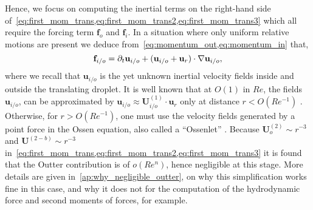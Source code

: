 Hence, we focus on computing the inertial terms on the right-hand side of~\ref{eq:first_mom_trans,eq:first_mom_trans2,eq:first_mom_trans3} which all require the forcing term $\textbf{f}_o$ and $\textbf{f}_i$. 
In a situation where only uniform relative motions are present we deduce from~\ref{eq:momentum_out,eq:momentum_in} that, 
\begin{equation}
    \textbf{f}_{i/o} = \partial_t \textbf{u}_{i/o} + (\textbf{u}_{i/o} + \textbf{u}_r)\cdot \mathbf{\nabla} \textbf{u}_{i/o},
\end{equation}
where we recall that $\textbf{u}_{i/o}$ is the yet unknown inertial velocity fields inside and outside the translating droplet. 
It is well known that at $O(1)$ in $Re$, the fields $\textbf{u}_{i/o}$, can be approximated by $\textbf{u}_{i/o} \approx \textbf{U}^{(1)}_{i/o}\cdot \textbf{u}_r$ only at distance $r < O(Re^{-1})$ \citet{proudman1957expansions}. 
Otherwise, for $r > O(Re^{-1})$, one must use the velocity fields generated by a point force in the Ossen equation, also called a ``Ossenlet'' \citep{pozrikidis2011introduction}. 
Because $\textbf{U}_o^{(2)}\sim r^{-3}$ and $\textbf{U}^{(2-b)}\sim r^{-3}$ in~\ref{eq:first_mom_trans,eq:first_mom_trans2,eq:first_mom_trans3} it is found that the Outter contribution is of $o(Re^n)$, hence negligible at this stage. 
More details are given in~\ref{ap:why_negligible_outter}, on why this simplification works fine in this case, and why it does not for the computation of the hydrodynamic force and second moments of forces, for example. 

